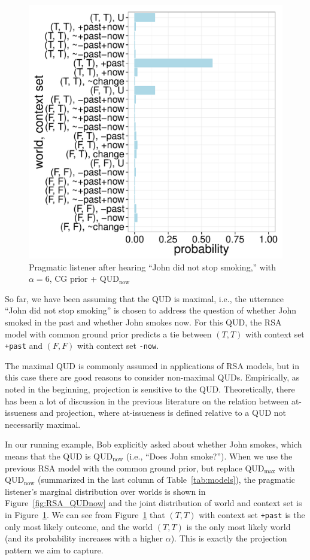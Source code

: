 \begin{figure}
 \includegraphics[scale=0.48]{figs/joint_CGprior_QUDnow.pdf}
 \caption{Pragmatic listener after hearing ``John did not stop smoking,'' with $\alpha=6$, CG prior + QUD$_\text{now}$\label{fig:joint-QUDnow}}
\end{figure}

So far, we have been assuming that the QUD is maximal, i.e., the utterance 
 ``John did not stop smoking'' is chosen to address the question of
 whether John smoked in the past and whether John smokes now.
For this QUD, the RSA model with common ground prior predicts a tie between 
 $(T, T)$ with context set \verb=+past= and
 $(F, F)$ with context set \verb=-now=.
 
The maximal QUD is commonly assumed in applications of RSA models, but 
 in this case there are good reasons to consider non-maximal QUDs.
Empirically, as noted in the beginning, projection is sensitive to the QUD.
Theoretically, there has been a lot of discussion in the previous literature
 \cite{Beaver2010:Have-You-Noticed, SimonsEtAl2001:What-Projects-and-Why} on the relation between at-issueness and projection, where at-issueness is defined 
 relative to a QUD not necessarily maximal.
 
In our running example, Bob explicitly asked about whether John smokes, 
 which means that the QUD is QUD$_\textrm{now}$ (i.e., ``Does John smoke?'').
When we use the previous RSA model with the common ground prior, but  
 replace QUD$_\textrm{max}$ with QUD$_\textrm{now}$ (summarized in the 
 last column of Table~\ref{tab:models}), the pragmatic listener's marginal distribution over worlds is shown in Figure~\ref{fig:RSA_QUDnow} and the joint
 distribution of world and context set is in Figure~\ref{fig:joint-QUDnow}.
We can see from Figure~\ref{fig:joint-QUDnow} that $(T, T)$ with context set
 \verb=+past= is 
 the only most likely outcome, and the world $(T, T)$ is the 
 only most likely world (and its probability increases with a higher $\alpha$).
This is exactly the projection pattern we aim to capture.


